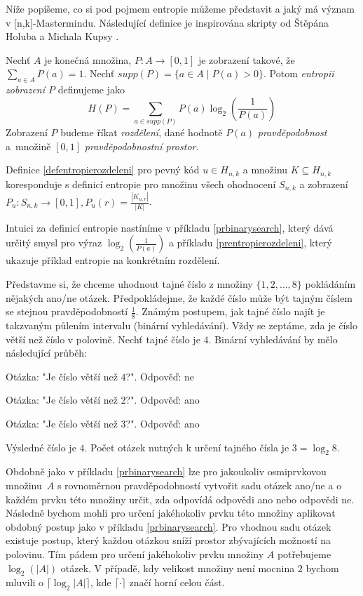 Níže popíšeme, co si pod pojmem entropie můžeme představit a jaký má význam v [n,k]-Mastermindu. Následující definice je inspirována skripty od Štěpána Holuba a Michala Kupsy \cite{Holub-informace}.

\begin{definice}[Entropie]\label{defentropie}
  Nechť $A$ je konečná množina, $P \colon A \to [0,1]$ je zobrazení takové, že $\sum_{a \in A} P(a) = 1$. Nechť $supp(P) = \{ a \in A \mid P(a) > 0\}$. Potom \emph{entropii zobrazení $P$} definujeme jako 
  \[H(P) = \sum_{a \in supp(P)}P(a)\log_2\left(\frac{1}{P(a)}\right)\]
  Zobrazení $P$ budeme říkat \emph{rozdělení}, dané hodnotě $P(a)$ \emph{pravděpodobnost} a~množině $[0,1]$ \emph{pravděpodobnostní prostor}. 
\end{definice}

\begin{pozn}
    Definice \ref{defentropierozdeleni} pro pevný kód $u\in H_{n,k}$ a množinu $K \subseteq H_{n,k}$ koresponduje s definicí entropie pro množinu všech ohodnocení $S_{n,k}$ a zobrazení $P_u\colon S_{n,k} \to [0,1], P_u(r) = \frac{|K_{u,r}|}{|K|}$.
\end{pozn}

Intuici za definicí entropie nastíníme v příkladu \ref{prbinarysearch}, který dává určitý smysl pro výraz $\log_2\left(\frac{1}{P(a)}\right)$ a příkladu \ref{prentropierozdeleni}, který ukazuje příklad entropie na konkrétním rozdělení.

\begin{prikl}\label{prbinarysearch}
Představme si, že chceme uhodnout tajné číslo z množiny $\{1,2,\dots,8\}$ pokládáním nějakých ano/ne otázek. Předpokládejme, že každé číslo může být tajným číslem se stejnou pravděpodobností $\frac{1}{8}$. Známým postupem, jak tajné číslo najít je takzvaným půlením intervalu (binární vyhledávání). Vždy se zeptáme, zda je číslo větší než číslo v polovině. Nechť tajné číslo je $4$. Binární vyhledávání by mělo následující průběh:

Otázka: "Je číslo větší než $4$?". 
Odpověď: ne

Otázka: "Je číslo větší než $2$?". 
Odpověď: ano

Otázka: "Je číslo větší než $3$?". 
Odpověď: ano

Výsledné číslo je $4$. Počet otázek nutných k určení tajného čísla je $3 = \log_2 8$.
\end{prikl}

\begin{pozn}\label{poznotazkynamnozinu}
Obdobně jako v příkladu \ref{prbinarysearch} lze pro jakoukoliv osmiprvkovou množinu~$A$ s rovnoměrnou pravděpodobností vytvořit sadu otázek ano/ne a o každém prvku této množiny určit, zda odpovídá odpovědi ano nebo odpovědi ne. Následně bychom mohli pro určení jakéhokoliv prvku této množiny aplikovat obdobný postup jako v příkladu \ref{prbinarysearch}. Pro vhodnou sadu otázek existuje postup, který každou otázkou sníží prostor zbývajících možností na polovinu. Tím pádem pro určení jakéhokoliv prvku množiny $A$ potřebujeme $\log_2(|A|)$ otázek. V případě, kdy velikost množiny není mocnina $2$ bychom mluvili o $\lceil \log_2 |A| \rceil$, kde $\lceil \cdot \rceil$ značí horní celou část. 
\end{pozn}

